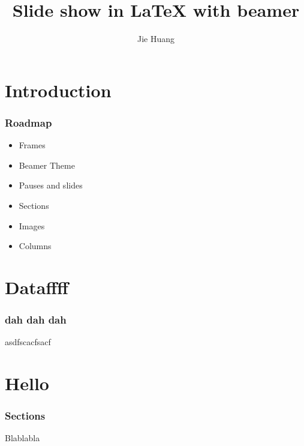 \documentclass{beamer}
\title{Slide show in {\LaTeX} with beamer}
\author{Jie Huang}
\begin{document}
\maketitle

\section{Introduction}
\begin{frame}
\frametitle{Roadmap}
\begin{itemize}
\item Frames \pause
\item Beamer Theme \pause
\item Pauses and slides \pause
\item Sections \pause
\item Images \pause
\item Columns 
\end{itemize}
\end{frame}

\section{Dataffff}
\begin{frame}
\frametitle{dah dah dah}
asdfscacfsacf 
\end{frame}

\section{Hello}
\begin{frame}
	\frametitle{Sections}
	Blablabla
\end{frame}
\end{document}

